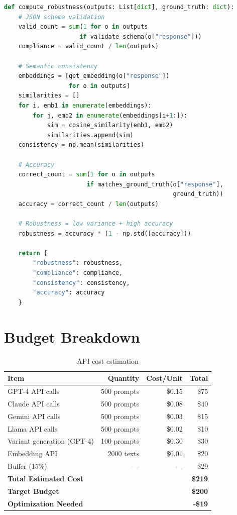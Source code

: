 \documentclass[11pt,a4paper]{article}
\begin{document}
\begin{lstlisting}[language=Python, caption=Robustness scoring]
def compute_robustness(outputs: List[dict], ground_truth: dict):
    # JSON schema validation
    valid_count = sum(1 for o in outputs 
                     if validate_schema(o["response"]))
    compliance = valid_count / len(outputs)
    
    # Semantic consistency
    embeddings = [get_embedding(o["response"]) 
                  for o in outputs]
    similarities = []
    for i, emb1 in enumerate(embeddings):
        for j, emb2 in enumerate(embeddings[i+1:]):
            sim = cosine_similarity(emb1, emb2)
            similarities.append(sim)
    consistency = np.mean(similarities)
    
    # Accuracy
    correct_count = sum(1 for o in outputs 
                       if matches_ground_truth(o["response"], 
                                               ground_truth))
    accuracy = correct_count / len(outputs)
    
    # Robustness = low variance + high accuracy
    robustness = accuracy * (1 - np.std([accuracy]))
    
    return {
        "robustness": robustness,
        "compliance": compliance,
        "consistency": consistency,
        "accuracy": accuracy
    }
\end{lstlisting}

\section{Budget Breakdown}

\begin{table}[h]
\centering
\begin{tabular}{@{}lrrr@{}}
\toprule
\textbf{Item} & \textbf{Quantity} & \textbf{Cost/Unit} & \textbf{Total} \\ \midrule
GPT-4 API calls & 500 prompts & \$0.15 & \$75 \\
Claude API calls & 500 prompts & \$0.08 & \$40 \\
Gemini API calls & 500 prompts & \$0.03 & \$15 \\
Llama API calls & 500 prompts & \$0.02 & \$10 \\
Variant generation (GPT-4) & 100 prompts & \$0.30 & \$30 \\
Embedding API & 2000 texts & \$0.01 & \$20 \\
Buffer (15\%) & — & — & \$29 \\
\midrule
\textbf{Total Estimated Cost} & & & \textbf{\$219} \\ 
\textbf{Target Budget} & & & \textbf{\$200} \\
\textbf{Optimization Needed} & & & \textbf{-\$19} \\ \bottomrule
\end{tabular}
\caption{API cost estimation}
\end{table}
\end{document}
